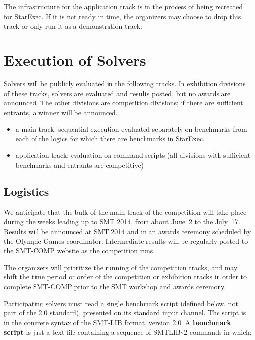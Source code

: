 \documentclass[12pt]{article}
\begin{document}
The infrastructure for the application track is in the process of being recreated for StarExec.
If it is not ready in time, the organizers may choose to drop this track or only run it as a demonstration track.

\section{Execution of Solvers}
\label{sec:exec}

Solvers will be publicly evaluated in the following tracks. In exhibition divisions of these tracks, solvers are evaluated and results posted, but no awards are announced. The other divisions are competition divisions; if there are sufficient entrants, a winner will be announced.
\begin{itemize}
\item a main track: sequential execution evaluated separately on benchmarks from each of the logics for which there are benchmarks in StarExec.
\item application track: evaluation on command scripts (all divisions with sufficient benchmarks and entrants are competitive)
\end{itemize}

\subsection{Logistics}

%
We anticipate that the bulk of the main track of the competition will take place during
the weeks leading up to SMT 2014, from about June~2 to the July~17.  Results will be
announced at SMT 2014 and in an awards ceremony scheduled by the Olympic Games coordinator.
  Intermediate results
will be regularly posted to the SMT-COMP website as the competition
runs.


The organizers will prioritize the running of the competition tracks, and may shift the
time period or order of the competition or exhibition tracks in order to complete SMT-COMP
prior to the SMT workshop and awards ceremony.

%
Participating solvers must read a single benchmark script (defined
below, not part of the 2.0 standard), presented on its standard input
channel. The script is in the concrete syntax of the SMT-LIB format,
version 2.0.   A
\textbf{benchmark script} is just a text file containing a sequence of SMTLIBv2 commands in which:
\end{document}
